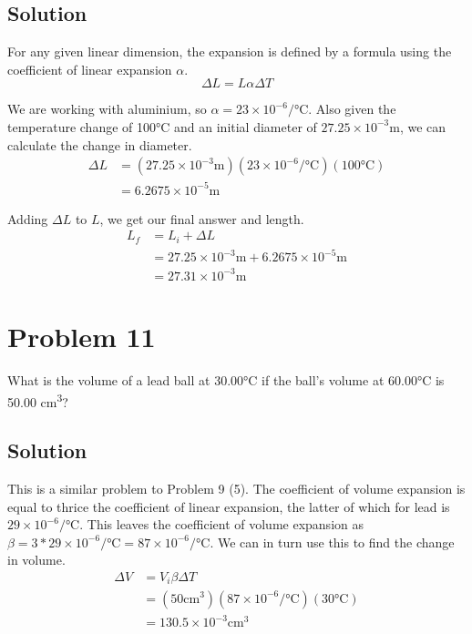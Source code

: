 \documentclass[12pt]{article}
\begin{document}
        \subsection{Solution}
            For any given linear dimension, the expansion is defined by a formula using the coefficient of linear expansion $\alpha$.
            \begin{equation}
                \Delta L = L\alpha \Delta T
            \end{equation}

            We are working with aluminium, so $\alpha = 23 \times 10^{-6}/\unit{\celsius}$. 
            Also given the temperature change of 100\unit{\celsius} and an initial diameter of $27.25 \times 10^{-3} \unit{\meter}$, we can calculate the change in diameter. 
            \begin{align}
                \Delta L    &=  (27.25 \times 10^{-3} \unit{\meter})(23 \times 10^{-6}/\unit{\celsius})(100 \unit{\celsius})\\
                    &=  6.2675 \times 10^{-5} \unit{\meter}
            \end{align}

            Adding $\Delta L$ to $L$, we get our final answer and length.
            \begin{align}
                L_f &=  L_i + \Delta L\\
                    &=  27.25 \times 10^{-3} \unit{\meter} + 6.2675 \times 10^{-5} \unit{\meter}\\
                    &=  \boxed{27.31 \times 10^{-3} \unit{\meter}}
            \end{align}

    \pagebreak
    \section{Problem 11}
        What is the volume of a lead ball at 30.00\unit{\celsius} if the ball's volume at 60.00\unit{\celsius} is 50.00 \unit{\centi\meter^3}?
        
        \subsection{Solution}
            This is a similar problem to Problem 9 (5). 
            The coefficient of volume expansion is equal to thrice the coefficient of linear expansion, the latter of which for lead is $29 \times 10^{-6}/\unit{\celsius}$.
            This leaves the coefficient of volume expansion as $\beta = 3 * 29 \times 10^{-6}/\unit{\celsius} = 87 \times 10^{-6}/\unit{\celsius}$.
            We can in turn use this to find the change in volume.
            \begin{align}
                \Delta V    &=  V_i \beta \Delta T\\
                    &=  (50 \unit{\centi\meter^3}) (87 \times 10^{-6}/\unit{\celsius}) (30 \unit{\celsius})\\
                    &=  130.5 \times 10^{-3} \unit{\centi\meter^3}
            \end{align}
\end{document}
